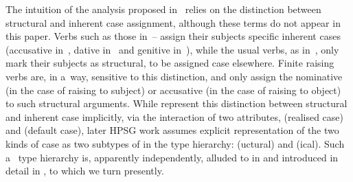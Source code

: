 \documentclass[output=paper]{langsci/langscibook}
\begin{document}
The intuition of the analysis proposed in~\citealt{SKG92} relies on the distinction between structural and inherent case assignment, although these terms do not appear in this paper.  Verbs such as those in~– assign their subjects specific inherent cases (accusative in~, dative in~ and genitive in~), while the usual verbs, as in~, only mark their subjects as structural, to be assigned case elsewhere.  Finite raising verbs are, in a~way, sensitive to this distinction, and only assign the nominative (in the case of raising to subject) or accusative (in the case of raising to object) to such structural arguments.  While \citet{SKG92} represent this distinction between structural and inherent case implicitly, via the interaction of two attributes,  (realised case) and  (default case), later HPSG work assumes explicit representation of the two kinds of case as two subtypes of  in the type hierarchy: (uctural) and (ical).  Such a~ type hierarchy is, apparently independently, alluded to in \citealt{Pollard94a} and introduced in detail in \citealt{HM94a}, to which we turn presently.
\end{document}
